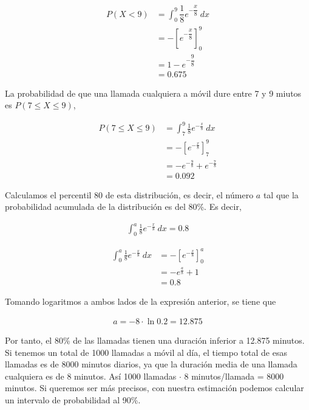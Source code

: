 \documentclass[12pt,a4paper,twoside,openright,titlepage,final]{article}
\begin{document}
\begin{align*}
P(X < 9) & = \int_{0}^{9} \dfrac{1}{8} e^{-\dfrac{x}{8}} \ dx \\
& = -\left[ e^{-\dfrac{x}{8}} \right]_0^9 \\
& = 1 - e^{-\dfrac{9}{8}} \\
& = 0.675
\end{align*}

La probabilidad de que una llamada cualquiera a móvil dure entre 7 y 9 miutos es $P(7 \leq X \leq 9)$,

\begin{align*}
P(7 \leq X \leq 9) & = \int_{7}^{9} \frac{1}{8} e^{-\frac{x}{8}} \ dx \\
& = -\left[ e^{-\frac{x}{8}} \right]_7^9 \\
& = -e^{-\frac{9}{8}} + e^{-\frac{7}{8}} \\
& = 0.092
\end{align*}

Calculamos el percentil 80 de esta distribución, es decir, el número $a$ tal que la probabilidad acumulada de la distribución es del 80\%. Es decir,

\begin{align*}
\int_{0}^{a} \frac{1}{8} e^{-\frac{x}{8}} \ dx = 0.8
\end{align*}

\begin{align*}
\int_{0}^{a} \frac{1}{8} e^{-\frac{x}{8}} \ dx & = - \left[ e^{-\frac{x}{8}} \right]_0^a \\
& = -e^{\frac{a}{8}} + 1 \\
& = 0.8
\end{align*}

Tomando logaritmos a ambos lados de la expresión anterior, se tiene que 

\begin{align*}
a = -8 \cdot \ln 0.2 = 12.875
\end{align*}

Por tanto, el 80\% de las llamadas tienen una duración inferior a 12.875 minutos.\\

Si tenemos un total de 1000 llamadas a móvil al día, el tiempo total de esas llamadas es de 8000 minutos diarios, ya que la duración media de una llamada cualquiera es de 8 minutos. Así 1000 llamadas $\cdot$ 8 minutos/llamada = 8000 minutos. Si queremos ser más precisos, con nuestra estimación podemos calcular un intervalo de probabilidad al 90\%.\\
\end{document}
